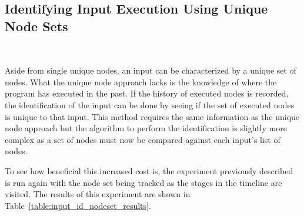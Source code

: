 \subsection{Identifying Input Execution Using Unique Node Sets}~\label{sec:pred_input_id_node_set}

Aside from single unique nodes, an input can be characterized by a unique set of
nodes. What the unique node approach lacks is the knowledge of where the
program has executed in the past. If the history of executed nodes is recorded, the
identification of the input can be done by seeing if the set of executed nodes
is unique to that input. This method requires the same information as the unique
node approach but the algorithm to perform the identification is slightly more complex as
a set of nodes must now be compared against each input's list of nodes.

To see how beneficial this increased cost is, the experiment
previously described is run again with the node set being
tracked as the stages in the timeline are visited. The results of
this experiment are shown in
Table~\ref{table:input_id_nodeset_results}.


